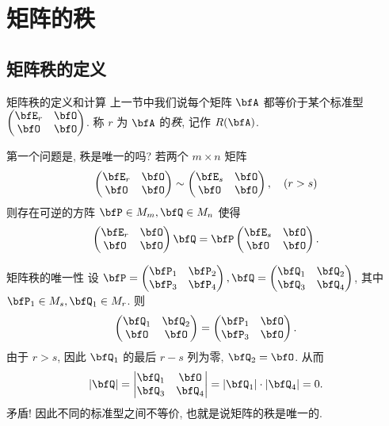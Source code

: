 \section{矩阵的秩}

\subsection{矩阵秩的定义}

\begin{frame}{矩阵秩的定义和计算}
	\onslide<+->
	上一节中我们说每个矩阵 $\bfA$ 都等价于某个标准型
	$\begin{pmatrix}
		\bfE_r&\bfO\\
		\bfO&\bfO
	\end{pmatrix}$.
	\onslide<+->
	称 $r$ 为 $\bfA$ 的\emph{秩}, 记作 \alert{$R(\bfA)$}.

	\onslide<+->
	第一个问题是, 秩是唯一的吗?
	\onslide<+->
	若两个 $m\times n$ 矩阵
	\[\begin{pmatrix}
		\bfE_r&\bfO\\
		\bfO&\bfO
	\end{pmatrix}\sim\begin{pmatrix}
		\bfE_s&\bfO\\
		\bfO&\bfO
	\end{pmatrix},\quad(r>s)\]
	\onslide<+->
	则存在可逆的方阵 $\bfP\in M_m,\bfQ\in M_n$ 使得
	\[\begin{pmatrix}
		\bfE_r&\bfO\\
		\bfO&\bfO
	\end{pmatrix}\bfQ=\bfP\begin{pmatrix}
		\bfE_s&\bfO\\
		\bfO&\bfO
	\end{pmatrix}.\]
\end{frame}


\begin{frame}{矩阵秩的唯一性}
	\onslide<+->
	设 $\bfP=\begin{pmatrix}
		\bfP_1&\bfP_2\\\bfP_3&\bfP_4
	\end{pmatrix},\bfQ=\begin{pmatrix}
		\bfQ_1&\bfQ_2\\\bfQ_3&\bfQ_4
	\end{pmatrix}$, 其中 $\bfP_1\in M_s,\bfQ_1\in M_r$.
	\onslide<+->
	则 \[\begin{pmatrix}
		\bfQ_1&\bfQ_2\\\bfO&\bfO
	\end{pmatrix}=\begin{pmatrix}
		\bfP_1&\bfO\\\bfP_3&\bfO
	\end{pmatrix}.\]
	\onslide<+->
	由于 $r>s$, 因此 $\bfQ_1$ 的最后 $r-s$ 列为零, $\bfQ_2=\bfO$.
	\onslide<+->
	从而
	\[|\bfQ|=\begin{vmatrix}
		\bfQ_1&\bfO\\\bfQ_3&\bfQ_4
	\end{vmatrix}=|\bfQ_1|\cdot|\bfQ_4|=0.\]
	\onslide<+->
	矛盾! 因此不同的标准型之间不等价, 也就是说矩阵的秩是唯一的.
\end{frame}


